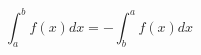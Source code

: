 \documentclass{book}
\begin{document}
\setcounter{chapter}{2}

\begin{colorboxed}[bgcolor=cyan,width=65mm]
\begin{equation}
\int^{b}_{a}f(x)dx=-\int^{a}_{b}f(x)dx
\end{equation}
\end{colorboxed}
\end{document}
